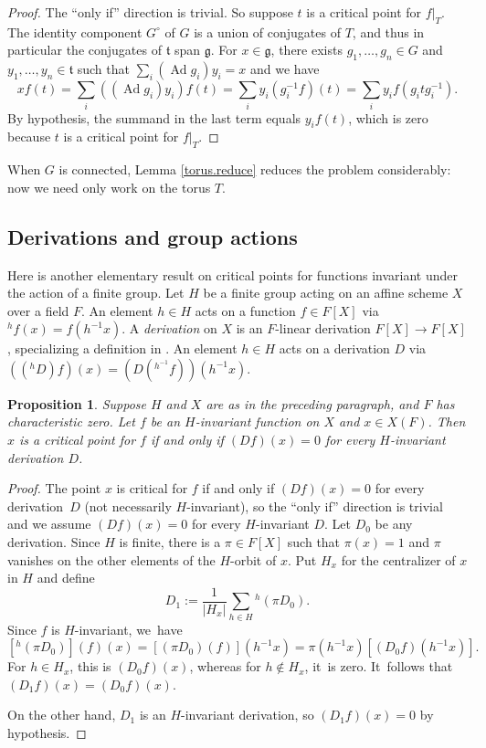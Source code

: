 \documentclass[JEP,XML,SOM,Unicode,NoFloatCountersInSection,published]{cedram}
\newtheorem{prop}[equation]{Proposition}
\theoremstyle{definition}
\newcommand{\stacklink}[1]{\href{https://stacks.math.columbia.edu/tag/#1}{#1}}
\newcommand{\stacks}[1]{\cite[Tag \stacklink{#1}]{stacks-project}}
\let\ic\circ
\newcommand{\mfg}{\mathfrak{g}}
\newcommand{\mft}{\mathfrak{t}}
\DeclareMathOperator{\Ad}{Ad}
\begin{document}
\begin{proof}
The ``only if'' direction is trivial. So suppose $t$ is a critical point for $f|_T$.
The identity component $G^\ic$ of $G$ is a union of conjugates of $T$, and thus in particular the conjugates of $\mft$
span $\mfg$. For $x \in \mfg$, there exists $g_1, \ldots, g_n \in G$ and $y_1, \ldots, y_n \in \mft$ such that $\sum_i (\Ad g_i)y_i = x$ and we have
\[
xf(t) = \sum_i ((\Ad g_i) y_i)f(t) = \sum_i y_i(g_i^{-1}f)(t) = \sum_i y_i f(g_itg_i^{-1}).
\]
By hypothesis, the summand in the last term equals $y_i f(t)$, which is zero because $t$ is a critical point for $f|_T$.
\end{proof}

When $G$ is connected, Lemma \ref{torus.reduce} reduces the problem considerably: now we need only work on the
torus $T$.

\subsection*{Derivations and group actions}
Here is another elementary result on critical points for functions invariant under the action of a finite group. Let $H$ be a finite group acting on an affine scheme $X$ over a field $F$. An element $h \in H$ acts on a function $f \in F[X]$ via ${^h\! f}(x) = f(h^{-1} x)$. A \emph{derivation} on $X$ is an $F$-linear derivation $F[X] \to F[X]$, specializing a definition in \stacks{00RN}. An element $h \in H$ acts on a derivation $D$ via $(({^h\! D})f)(x) = (D({^{h^{-1}}\!f}))(h^{-1}x)$.

\begin{prop} \label{Winv.crit}
Suppose $H$ and $X$ are as in the preceding paragraph, and $F$ has characteristic zero. Let $f$ be an $H$-invariant function on $X$ and $x \in X(F)$. Then $x$ is a critical point for $f$ if and only if $(Df)(x) = 0$ for every $H$-invariant derivation $D$.
\end{prop}

\begin{proof}
The point $x$ is critical for $f$ if and only if $(Df)(x) = 0$ for every derivation~$D$ (not necessarily $H$-invariant), so the ``only if'' direction is trivial and we assume $(Df)(x) = 0$ for every $H$-invariant $D$. Let $D_0$ be any derivation. Since $H$ is finite, there is a $\pi \in F[X]$ such that $\pi(x) = 1$ and $\pi$ vanishes on the other elements of the $H$-orbit of $x$. Put $H_x$ for the centralizer of $x$ in $H$ and define
\[
D_1 := \frac{1}{\left| H_x \right|} \sum_{h \in H} {^h(\pi D_0)}.
\]
Since $f$ is $H$-invariant, we~have
\[
\left[ {^h(\pi D_0)} \right] (f)(x) = \left[ (\pi D_0)(f) \right] (h^{-1} x) = \pi(h^{-1} x) \left[ (D_0 f)(h^{-1}x) \right].
\]
For $h \in H_x$, this is $(D_0 f)(x)$, whereas for $h \not\in H_x$, it~is zero. It~follows that $(D_1 f)(x) = (D_0 f)(x)$.

On the other hand, $D_1$ is an $H$-invariant derivation, so $(D_1 f)(x) = 0$ by hypothesis.
\end{proof}
\end{document}
